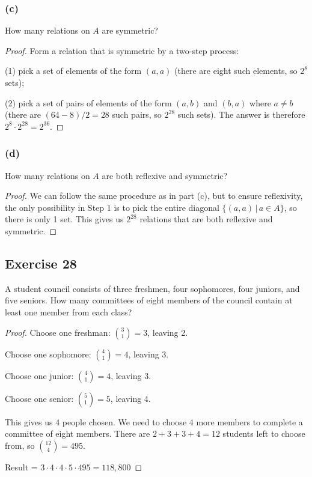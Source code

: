 \documentclass[14pt]{extarticle}
\begin{document}
\subsubsection{(c)}
How many relations on \(A\) are symmetric?

\begin{proof}
     Form a relation that is symmetric by a two-step process:

     (1) pick a set of elements of the form \((a, a)\) (there are eight such elements, so \(2^8\) sets);

     (2) pick a set of pairs of elements of the form \((a, b)\) and \((b, a)\) where \(a \neq b\) (there are \((64 - 8)/2 = 28\)
     such pairs, so \(2^{28}\) such sets). The answer is therefore \(2^8 \cdot 2^{28} = 2^{36}\).
\end{proof}

\subsubsection{(d)}
How many relations on \(A\) are both reflexive and symmetric?

\begin{proof}
     We can follow the same procedure as in part (c), but to ensure reflexivity, the only possibility in Step 1 is to pick the
     entire diagonal \(\{(a,a) \,|\, a \in A\}\), so there is only 1 set. This gives us \(2^{28}\) relations that are both
     reflexive and symmetric.
\end{proof}

\subsection{Exercise 28}
A student council consists of three freshmen, four sophomores, four juniors, and five seniors. How many committees of eight
members of the council contain at least one member from each class?

\begin{proof}
     Choose one freshman: \(\binom{3}{1} = 3\), leaving 2.

     Choose one sophomore: \(\binom{4}{1} = 4\), leaving 3.

     Choose one junior: \(\binom{4}{1} = 4\), leaving 3.

     Choose one senior: \(\binom{5}{1} = 5\), leaving 4.

     This gives us 4 people chosen. We need to choose 4 more members to complete a committee of eight members. There are
     \(2+3+3+4 = 12\) students left to choose from, so \(\binom{12}{4} = 495\).

     Result = \(3 \cdot 4 \cdot 4 \cdot 5 \cdot 495 = 118,800\)
\end{proof}
\end{document}
